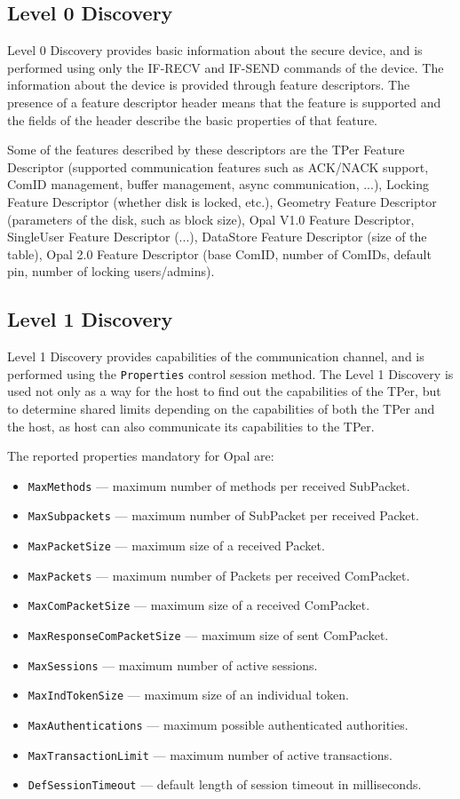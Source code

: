 \subsection{Level 0 Discovery}

Level 0 Discovery provides basic information about the secure device, and is performed using only the IF-RECV and IF-SEND commands of the device. The information about the device is provided through feature descriptors. The presence of a feature descriptor header means that the feature is supported and the fields of the header describe the basic properties of that feature.

Some of the features described by these descriptors are the TPer Feature Descriptor (supported communication features such as ACK/NACK support, ComID management, buffer management, async communication, ...), Locking Feature Descriptor (whether disk is locked, etc.), Geometry Feature Descriptor (parameters of the disk, such as block size), Opal V1.0 Feature Descriptor, SingleUser Feature Descriptor (...), DataStore Feature Descriptor (size of the table), Opal 2.0 Feature Descriptor (base ComID, number of ComIDs, default pin, number of locking users/admins).

\subsection{Level 1 Discovery}

Level 1 Discovery provides capabilities of the communication channel, and is performed using the \verb|Properties| control session method. The Level 1 Discovery is used not only as a way for the host to find out the capabilities of the TPer, but to determine shared limits depending on the capabilities of both the TPer and the host, as host can also communicate its capabilities to the TPer.

The reported properties mandatory for Opal are:
\begin{itemize}
\item \verb|MaxMethods| --- maximum number of methods per received SubPacket.
\item \verb|MaxSubpackets| --- maximum number of SubPacket per received Packet.
\item \verb|MaxPacketSize| --- maximum size of a received Packet.
\item \verb|MaxPackets| --- maximum number of Packets per received ComPacket.
\item \verb|MaxComPacketSize| --- maximum size of a received ComPacket.
\item \verb|MaxResponseComPacketSize| --- maximum size of sent ComPacket.
\item \verb|MaxSessions| --- maximum number of active sessions.
\item \verb|MaxIndTokenSize| --- maximum size of an individual token.
\item \verb|MaxAuthentications| --- maximum possible authenticated authorities.
\item \verb|MaxTransactionLimit| --- maximum number of active transactions.
\item \verb|DefSessionTimeout| --- default length of session timeout in milliseconds.
\end{itemize}

